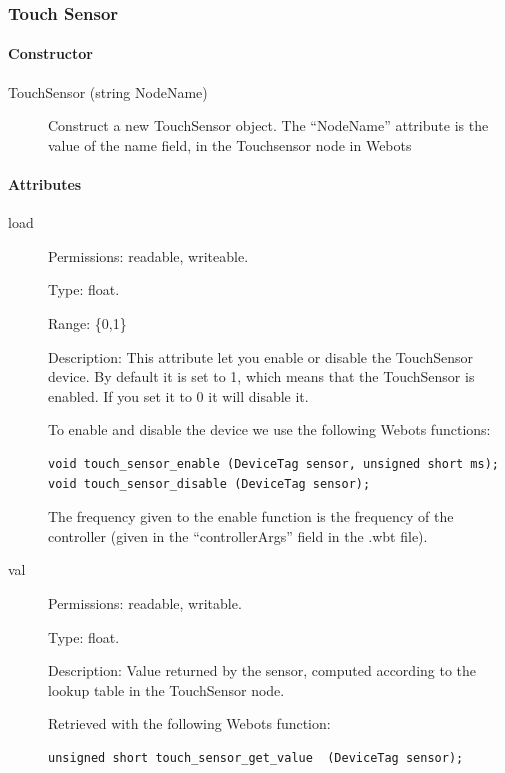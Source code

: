 \subsubsection{Touch Sensor}
\label{webots.uobjects.robotdevices.touchsensor}%

\paragraph{Constructor}
\label{webots.uobjects.robotdevices.touchsensor.constructor}%

\noindent
\begin{description}
\item[{TouchSensor (string NodeName)}]            Construct a new TouchSensor object. The ``NodeName'' attribute is the value
          of the name field, in the Touchsensor node in Webots

\end{description}

\paragraph{Attributes}
\label{webots.uobjects.robotdevices.touchsensor.attributes}%

\noindent
\begin{description}
\item[{load}]     Permissions: readable, writeable.


  Type: float.


  Range: \{0,1\}


  Description: This attribute let you enable or disable the
  TouchSensor device.  By default it is set to 1, which means that the
  TouchSensor is enabled. If you set it to 0 it will disable it.


  To enable and disable the device we use the following Webots
  functions:


\begin{lstlisting}
void touch_sensor_enable (DeviceTag sensor, unsigned short ms);
void touch_sensor_disable (DeviceTag sensor);
\end{lstlisting}

          The frequency given to the enable function is the frequency of the
          \urbi controller (given in the ``controllerArgs'' field in the .wbt file).

\item[{val}]             Permissions: readable, writable.


  Type: float.


  Description: Value returned by the sensor, computed according to the
  lookup table in the TouchSensor node.


          Retrieved with the following Webots function:


\begin{lstlisting}
unsigned short touch_sensor_get_value  (DeviceTag sensor);
\end{lstlisting}
\end{description}

